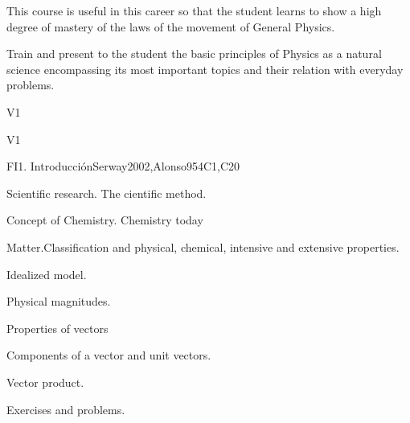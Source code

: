 \begin{syllabus}


\begin{justification}
This course is useful in this career so that the student learns to show a high degree of mastery of the laws of the movement of General Physics.
\end{justification}

\begin{goals}
\item Train and present to the student the basic principles of Physics as a natural science encompassing its most important topics and their relation  with everyday problems.
\end{goals}

\begin{outcomes}{V1}
  \item {}
  \item {}
  \item {}
\end{outcomes}

\begin{competences}{V1}
    \item {}
    \item {}
\end{competences}

\begin{unit}{FI1. Introducción}{}{Serway2002,Alonso95}{4}{C1,C20}
\begin{topics}
      \item Scientific research. The cientific method.
      \item Concept of Chemistry. Chemistry today
      \item Matter.Classification and physical, chemical, intensive and extensive properties. 
      \item Idealized model.
      \item Physical magnitudes.
      \item Properties of vectors
      \item Components of a vector and unit vectors.
      \item Vector product.
      \item Exercises and problems.
   \end{topics}


\end{unit}
\end{syllabus}
